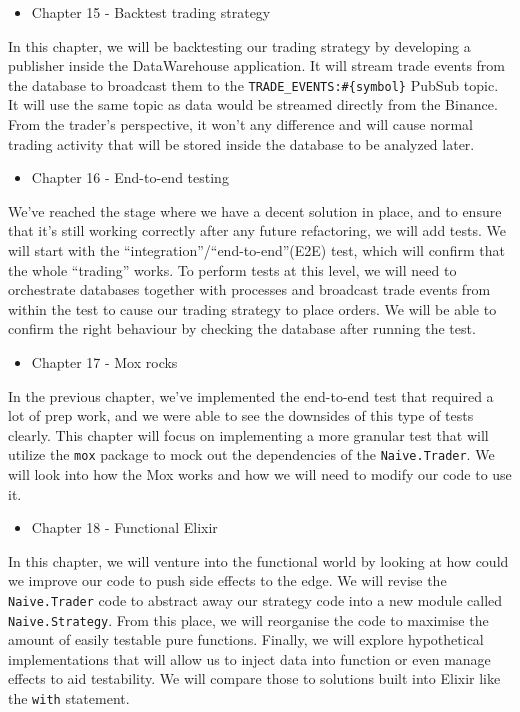 \documentclass[
  oneside]{book}
\providecommand{\tightlist}{%
  \setlength{\itemsep}{0pt}\setlength{\parskip}{0pt}}
\begin{document}
\begin{itemize}
\tightlist
\item
  Chapter 15 - Backtest trading strategy
\end{itemize}

In this chapter, we will be backtesting our trading strategy by developing a publisher inside the DataWarehouse application. It will stream trade events from the database to broadcast them to the \texttt{TRADE\_EVENTS:\#\{symbol\}} PubSub topic. It will use the same topic as data would be streamed directly from the Binance. From the trader's perspective, it won't any difference and will cause normal trading activity that will be stored inside the database to be analyzed later.

\begin{itemize}
\tightlist
\item
  Chapter 16 - End-to-end testing
\end{itemize}

We've reached the stage where we have a decent solution in place, and to ensure that it's still working correctly after any future refactoring, we will add tests. We will start with the ``integration''/``end-to-end''(E2E) test, which will confirm that the whole ``trading'' works. To perform tests at this level, we will need to orchestrate databases together with processes and broadcast trade events from within the test to cause our trading strategy to place orders. We will be able to confirm the right behaviour by checking the database after running the test.

\begin{itemize}
\tightlist
\item
  Chapter 17 - Mox rocks
\end{itemize}

In the previous chapter, we've implemented the end-to-end test that required a lot of prep work, and we were able to see the downsides of this type of tests clearly. This chapter will focus on implementing a more granular test that will utilize the \texttt{mox} package to mock out the dependencies of the \texttt{Naive.Trader}. We will look into how the Mox works and how we will need to modify our code to use it.

\begin{itemize}
\tightlist
\item
  Chapter 18 - Functional Elixir
\end{itemize}

In this chapter, we will venture into the functional world by looking at how could we improve our code to push side effects to the edge. We will revise the \texttt{Naive.Trader} code to abstract away our strategy code into a new module called \texttt{Naive.Strategy}. From this place, we will reorganise the code to maximise the amount of easily testable pure functions. Finally, we will explore hypothetical implementations that will allow us to inject data into function or even manage effects to aid testability. We will compare those to solutions built into Elixir like the \texttt{with} statement.
\end{document}
